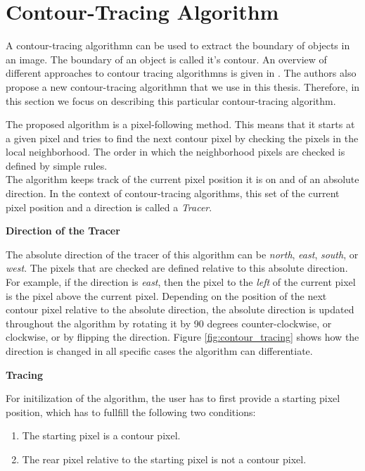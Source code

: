 \documentclass[thesis.tex]{subfiles}
\begin{document}
\section{Contour-Tracing Algorithm} \label{contourtracingalgorithm}
A contour-tracing algorithmn can be used to extract the boundary of objects in an image. The boundary of an object is called it's contour. An overview of different approaches to contour tracing algorithmns is given in \cite{seo2016fast}. The authors also propose a new contour-tracing algorithmn that we use in this thesis. Therefore, in this section we focus on describing this particular contour-tracing algorithm.

The proposed algorithm is a pixel-following method. This means that it starts at a given pixel and tries to find the next contour pixel by checking the pixels in the local neighborhood. The order in which the neighborhood pixels are checked is defined by simple rules. \\ The algorithm keeps track of the current pixel position it is on and of an absolute direction. In the context of contour-tracing algorithms, this set of the current pixel position and a direction is called a \textit{Tracer}. 

\textbf{Direction of the Tracer}

The absolute direction of the tracer of this algorithm can be \textit{north}, \textit{east}, \textit{south}, or \textit{west}. The pixels that are checked are defined relative to this absolute direction. For example, if the direction is \textit{east}, then the pixel to the \textit{left} of the current pixel is the pixel above the current pixel. Depending on the position of the next contour pixel relative to the absolute direction, the absolute direction is updated throughout the algorithm by rotating it by 90 degrees counter-clockwise, or clockwise, or by flipping the direction. Figure \ref{fig:contour_tracing} shows how the direction is changed in all specific cases the algorithm can differentiate.

\newpage
\textbf{Tracing}

For initilization of the algorithm, the user has to first provide a starting pixel position, which has to fullfill the following two conditions:  
\begin{enumerate}
\item{The starting pixel is a contour pixel.}
\item{The rear pixel relative to the starting pixel is not a contour pixel.}
\end{enumerate}
  
\end{document}
